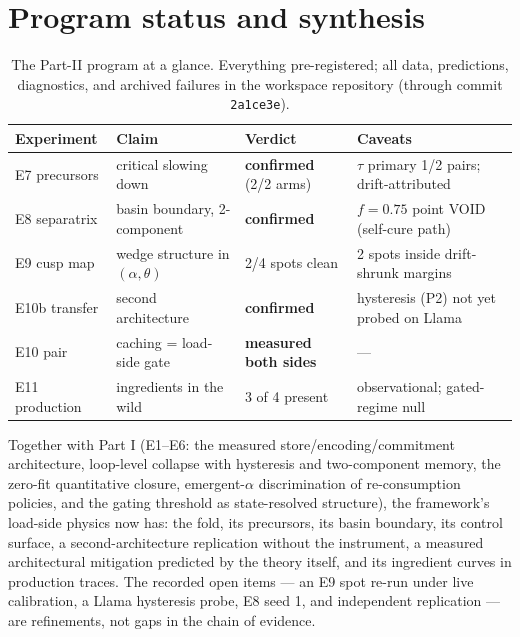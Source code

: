 \documentclass[11pt]{article}
\newcommand{\commit}[1]{\texttt{\small #1}}
\begin{document}
\section{Program status and synthesis}
\begin{table}[htbp]
\centering\small
\begin{tabular}{@{}llll@{}}
\toprule
Experiment & Claim & Verdict & Caveats \\
\midrule
E7 precursors & critical slowing down & \textbf{confirmed} (2/2 arms) &
$\tau$ primary 1/2 pairs; drift-attributed \\
E8 separatrix & basin boundary, 2-component & \textbf{confirmed} &
$f{=}0.75$ point VOID (self-cure path) \\
E9 cusp map & wedge structure in $(\alpha,\theta)$ & 2/4 spots clean &
2 spots inside drift-shrunk margins \\
E10b transfer & second architecture & \textbf{confirmed} &
hysteresis (P2) not yet probed on Llama \\
E10 pair & caching = load-side gate & \textbf{measured both sides} &
--- \\
E11 production & ingredients in the wild & 3 of 4 present &
observational; gated-regime null \\
\bottomrule
\end{tabular}
\caption{The Part-II program at a glance. Everything pre-registered;
all data, predictions, diagnostics, and archived failures in the
workspace repository (through commit \commit{2a1ce3e}).}
\end{table}

Together with Part I (E1--E6: the measured store/encoding/commitment
architecture, loop-level collapse with hysteresis and two-component
memory, the zero-fit quantitative closure, emergent-$\alpha$
discrimination of re-consumption policies, and the gating threshold as
state-resolved structure), the framework's load-side physics now has:
the fold, its precursors, its basin boundary, its control surface, a
second-architecture replication without the instrument, a measured
architectural mitigation predicted by the theory itself, and its
ingredient curves in production traces. The recorded open items ---
an E9 spot re-run under live calibration, a Llama hysteresis probe,
E8 seed 1, and independent replication --- are refinements, not gaps in
the chain of evidence.
\end{document}
